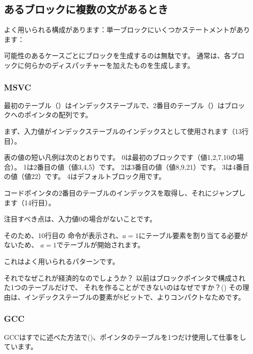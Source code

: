 ﻿\subsection{あるブロックに複数の文があるとき}

よく用いられる構成があります：単一ブロックにいくつかステートメントがあります：



可能性のあるケースごとにブロックを生成するのは無駄です。
通常は、各ブロックに何らかのディスパッチャーを加えたものを生成します。

\subsubsection{MSVC}



最初のテーブル（）はインデックステーブルで、2番目のテーブル（）はブロックへのポインタの配列です。

まず、入力値がインデックステーブルのインデックスとして使用されます（13行目）。

表の値の短い凡例は次のとおりです。
0は最初のブロックです（値1,2,7,10の場合）。
1は2番目の値（値3,4,5）です。
2は3番目の値（値8,9,21）です。
3は4番目の値（値22）です。
4はデフォルトブロック用です。

コードポインタの2番目のテーブルのインデックスを取得し、それにジャンプします（14行目）。

注目すべき点は、入力値0の場合がないことです。

そのため、10行目の \DEC 命令が表示され、$a=1$にテーブル要素を割り当てる必要がないため、
$a=1$でテーブルが開始されます。

これはよく用いられるパターンです。

それでなぜこれが経済的なのでしょうか？
以前はブロックポインタで構成された1つのテーブルだけで、
それを作ることができないのはなぜですか？()
その理由は、インデックステーブルの要素が8ビットで、よりコンパクトなためです。

\subsubsection{GCC}

GCCはすでに述べた方法で()、ポインタのテーブルを1つだけ使用して仕事をしています。

